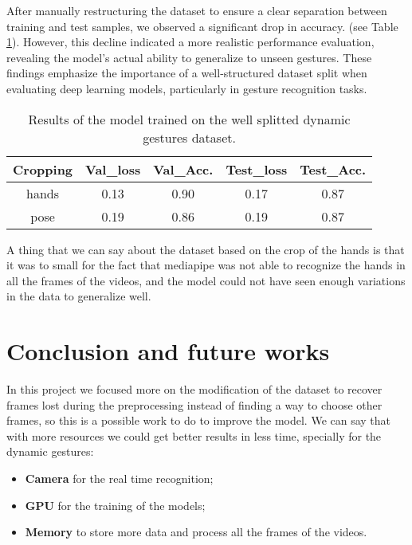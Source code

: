 \documentclass[10pt,twocolumn,letterpaper]{article}
\begin{document}
After manually restructuring the dataset to ensure a clear separation between training and test samples, we observed a significant drop in accuracy. 
(see Table \ref{tab:dynamicGesturesWell}).
However, this decline indicated a more realistic performance evaluation, revealing the model’s actual ability to generalize to unseen gestures.  
These findings emphasize the importance of a well-structured dataset split when evaluating deep learning models, particularly in gesture recognition tasks.
\begin{table}[h]
   \begin{center}
   \begin{tabular}{|c|c|c|c|c|}
   \hline
   \textbf{Cropping} & \textbf{Val\_loss} & \textbf{Val\_Acc.} & \textbf{Test\_loss} & \textbf{Test\_Acc.}\\
   \hline\hline
   hands & 0.13 & 0.90 & 0.17 & 0.87 \\
   pose & 0.19 & 0.86 & 0.19 & 0.87 \\
   \hline
   \end{tabular}
   \end{center}
   \caption{Results of the model trained on the well splitted dynamic gestures dataset.}
   \label{tab:dynamicGesturesWell}
\end{table}
A thing that we can say about the dataset based on the crop of the hands is that it was to small for the fact that mediapipe was not able to recognize the hands in all the frames of the videos, and the model could not have seen enough variations in the data to generalize well.


\section{Conclusion and future works}
In this project we focused more on the modification of the dataset to recover frames lost during the preprocessing
instead of finding a way to choose other frames, so this is a possible work to do to improve the model.
We can say that with more resources we could get better results in less time, specially for the dynamic gestures:
\begin{itemize}
   \item \textbf{Camera} for the real time recognition;
   \item \textbf{GPU} for the training of the models;
   \item \textbf{Memory} to store more data and process all the frames of the videos.
\end{itemize}

{\small


}
\end{document}
